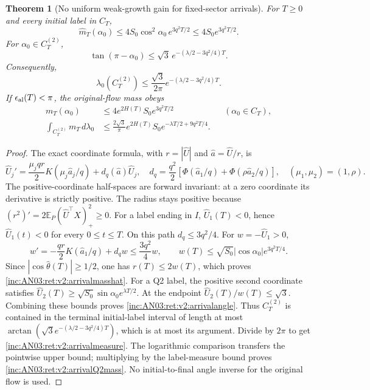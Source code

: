\documentclass[11pt]{article}
\numberwithin{equation}{section}
\newtheorem{theorem}{Theorem}[section]
\theoremstyle{remark}\newtheorem{remark}[theorem]{Remark}
\newcommand{\E}{\mathbb E}
\newcommand{\dd}{\,d}
\newcommand{\1}{\mathbf 1}
\begin{document}
\begin{theorem}[No uniform weak-growth gain for fixed-sector arrivals]
\label{inc:AN03:ret:v2:arrivalupper}
For $T\ge0$ and every initial label in $C_T$,
\begin{equation}\label{inc:AN03:ret:v2:arrivalmasshat}
 \widehat m_T(\alpha_0)
 \le4S_0\cos^2\alpha_0\,e^{3q^2T/2}
 \le4S_0e^{3q^2T/2}.
\end{equation}
For $\alpha_0\in C_T^{(2)}$,
\begin{equation}\label{inc:AN03:ret:v2:arrivalangle}
 \tan(\pi-\alpha_0)
 \le\sqrt3\,e^{-(\lambda/2-3q^2/4)T}.
\end{equation}
Consequently,
\begin{equation}\label{inc:AN03:ret:v2:arrivalmeasure}
 \lambda_0(C_T^{(2)})
 \le\frac{\sqrt3}{2\pi}e^{-(\lambda/2-3q^2/4)T}.
\end{equation}
If $\epsilon_{\rm al}(T)<\pi$, the original-flow mass obeys
\begin{align}
 m_T(\alpha_0)&\le4e^{2H(T)}S_0e^{3q^2T/2}
 &&(\alpha_0\in C_T),\label{inc:AN03:ret:v2:arrivalmass}\\
 \int_{C_T^{(2)}}m_T\dd\lambda_0
 &\le\frac{2\sqrt3}{\pi}e^{2H(T)}S_0
 e^{-\lambda T/2+9q^2T/4}.\label{inc:AN03:ret:v2:arrivalQ2mass}
\end{align}
\end{theorem}
\begin{proof}
The exact coordinate formula, with $r=|\widehat U|$ and
$\widehat a=\widehat U/r$, is
\begin{equation}\label{inc:AN03:ret:v2:coordinatefield}
 \widehat U_j'=\frac{\mu_jqr}{2}K(\mu_j\widehat a_j/q)
 +d_q(\widehat a)\widehat U_j,
 \quad
 d_q=\frac{q^2}{2}[\Phi(\widehat a_1/q)+\Phi(\rho\widehat a_2/q)],
 \quad (\mu_1,\mu_2)=(1,\rho).
\end{equation}
The positive-coordinate half-spaces are forward invariant: at a zero
coordinate its derivative is strictly positive. The radius stays
positive because $(r^2)'=2\E_P(\widehat U^\top X)_+^2\ge0$.
For a label ending in $I$, $\widehat U_1(T)<0$, hence
$\widehat U_1(t)<0$ for every $0\le t\le T$. On this path
$d_q\le3q^2/4$. For $w=-\widehat U_1>0$,
\[
 w'=-\frac{qr}{2}K(\widehat a_1/q)+d_qw
 \le\frac{3q^2}{4}w,
 \qquad w(T)\le\sqrt{S_0}|\cos\alpha_0|e^{3q^2T/4}.
\]
Since $|\cos\widehat\theta(T)|\ge1/2$, one has $r(T)\le2w(T)$,
which proves \eqref{inc:AN03:ret:v2:arrivalmasshat}.
For a Q2 label, the positive second coordinate satisfies
$\widehat U_2(T)\ge\sqrt{S_0}\sin\alpha_0 e^{\lambda T/2}$.
At the endpoint $\widehat U_2(T)/w(T)\le\sqrt3$.
Combining these bounds proves \eqref{inc:AN03:ret:v2:arrivalangle}.
Thus $C_T^{(2)}$ is contained in the terminal initial-label interval
of length at most
$\arctan(\sqrt3 e^{-(\lambda/2-3q^2/4)T})$, which is at most its
argument. Divide by $2\pi$ to get \eqref{inc:AN03:ret:v2:arrivalmeasure}.
The logarithmic comparison transfers the pointwise upper bound; multiplying
by the label-measure bound proves \eqref{inc:AN03:ret:v2:arrivalQ2mass}.
No initial-to-final angle inverse for the original flow is used.
\end{proof}
\end{document}
